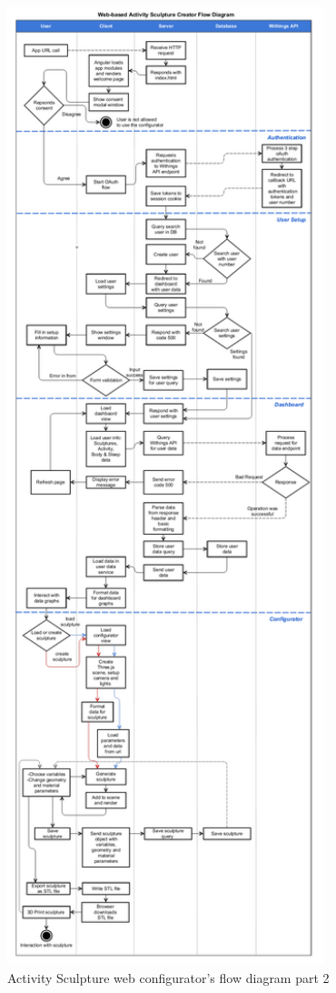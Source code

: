 \documentclass[../medieninformatik-arbeit.tex]{subfiles}
\begin{document}
\newpage

\begin{figure}[ht!]
\captionsetup{width=\textwidth}
\begin{center}
  \includegraphics[width=0.82\textwidth]{Configurator/img/flow_diagram_2}
  \caption{Activity Sculpture web configurator's flow diagram part 2}
\label{fig:flowdiagram2}
\end{center}
\end{figure}
\end{document}

